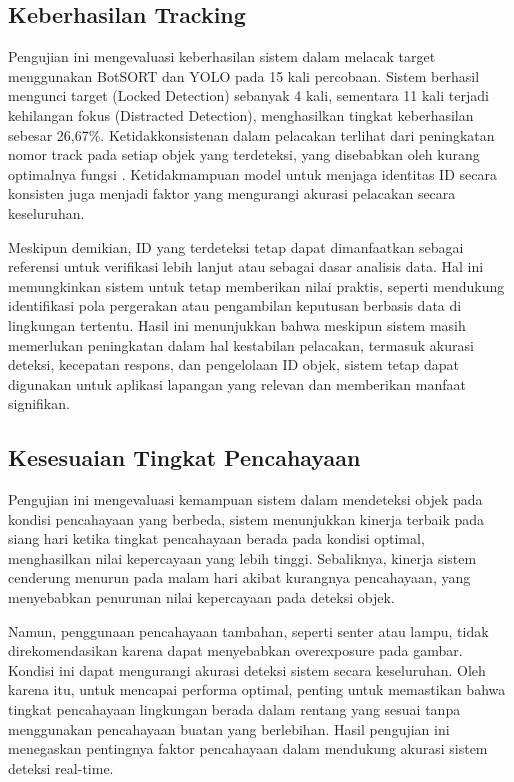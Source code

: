 \subsection{Keberhasilan Tracking}
\label{sec:performatracking}

Pengujian ini mengevaluasi keberhasilan sistem dalam melacak target menggunakan BotSORT dan YOLO pada 15 kali percobaan. Sistem berhasil mengunci target (Locked Detection) sebanyak 4 kali, sementara 11 kali terjadi kehilangan fokus (Distracted Detection), menghasilkan tingkat keberhasilan sebesar 26,67\%. Ketidakkonsistenan dalam pelacakan terlihat dari peningkatan nomor track pada setiap objek yang terdeteksi, yang disebabkan oleh kurang optimalnya fungsi . Ketidakmampuan model untuk menjaga identitas ID secara konsisten juga menjadi faktor yang mengurangi akurasi pelacakan secara keseluruhan.

Meskipun demikian, ID yang terdeteksi tetap dapat dimanfaatkan sebagai referensi untuk verifikasi lebih lanjut atau sebagai dasar analisis data. Hal ini memungkinkan sistem untuk tetap memberikan nilai praktis, seperti mendukung identifikasi pola pergerakan atau pengambilan keputusan berbasis data di lingkungan tertentu. Hasil ini menunjukkan bahwa meskipun sistem masih memerlukan peningkatan dalam hal kestabilan pelacakan, termasuk akurasi deteksi, kecepatan respons, dan pengelolaan ID objek, sistem tetap dapat digunakan untuk aplikasi lapangan yang relevan dan memberikan manfaat signifikan.

\subsection{Kesesuaian Tingkat Pencahayaan}
\label{sec:kesesuaianpencahayaan}

Pengujian ini mengevaluasi kemampuan sistem dalam mendeteksi objek pada kondisi pencahayaan yang berbeda, sistem menunjukkan kinerja terbaik pada siang hari ketika tingkat pencahayaan berada pada kondisi optimal, menghasilkan nilai kepercayaan yang lebih tinggi. Sebaliknya, kinerja sistem cenderung menurun pada malam hari akibat kurangnya pencahayaan, yang menyebabkan penurunan nilai kepercayaan pada deteksi objek.

Namun, penggunaan pencahayaan tambahan, seperti senter atau lampu, tidak direkomendasikan karena dapat menyebabkan overexposure pada gambar. Kondisi ini dapat mengurangi akurasi deteksi sistem secara keseluruhan. Oleh karena itu, untuk mencapai performa optimal, penting untuk memastikan bahwa tingkat pencahayaan lingkungan berada dalam rentang yang sesuai tanpa menggunakan pencahayaan buatan yang berlebihan. Hasil pengujian ini menegaskan pentingnya faktor pencahayaan dalam mendukung akurasi sistem deteksi real-time.

